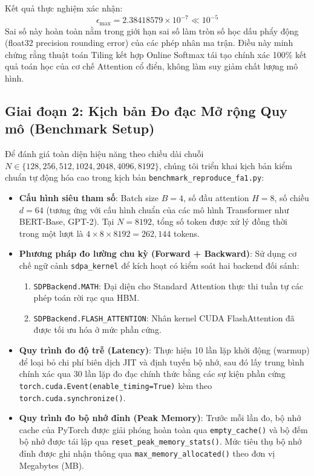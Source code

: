 \documentclass[10pt,a4paper]{article}
\begin{document}
Kết quả thực nghiệm xác nhận:
\begin{equation}
\epsilon_{\max} = 2.38418579 \times 10^{-7} \ll 10^{-5}
\end{equation}
Sai số này hoàn toàn nằm trong giới hạn sai số làm tròn số học dấu phẩy động (float32 precision rounding error) của các phép nhân ma trận. Điều này minh chứng rằng thuật toán Tiling kết hợp Online Softmax tái tạo chính xác 100\% kết quả toán học của cơ chế Attention cổ điển, không làm suy giảm chất lượng mô hình.

\subsection{Giai đoạn 2: Kịch bản Đo đạc Mở rộng Quy mô (Benchmark Setup)}
Để đánh giá toàn diện hiệu năng theo chiều dài chuỗi $N \in \{128, 256, 512, 1024, 2048, 4096, 8192\}$, chúng tôi triển khai kịch bản kiểm chuẩn tự động hóa cao trong kịch bản \texttt{benchmark\_reproduce\_fa1.py}:
\begin{itemize}[leftmargin=*]
    \item \textbf{Cấu hình siêu tham số}: Batch size $B = 4$, số đầu attention $H = 8$, số chiều $d = 64$ (tương ứng với cấu hình chuẩn của các mô hình Transformer như BERT-Base, GPT-2). Tại $N = 8192$, tổng số token được xử lý đồng thời trong một lượt là $4 \times 8 \times 8192 = 262{,}144$ tokens.
    \item \textbf{Phương pháp đo lường chu kỳ (Forward + Backward)}: Sử dụng cơ chế ngữ cảnh \texttt{\small sdpa\_kernel} để kích hoạt có kiểm soát hai backend đối sánh:
    \begin{enumerate}
        \item \texttt{SDPBackend.MATH}: Đại diện cho Standard Attention thực thi tuần tự các phép toán rời rạc qua HBM.
        \item \texttt{SDPBackend.FLASH\_ATTENTION}: Nhân kernel CUDA FlashAttention đã được tối ưu hóa ở mức phần cứng.
    \end{enumerate}
    \item \textbf{Quy trình đo độ trễ (Latency)}: Thực hiện 10 lần lặp khởi động (warmup) để loại bỏ chi phí biên dịch JIT và định tuyến bộ nhớ, sau đó lấy trung bình chính xác qua 30 lần lặp đo đạc chính thức bằng các sự kiện phần cứng \texttt{torch.cuda.Event(enable\_timing=True)} kèm theo \texttt{torch.cuda.synchronize()}.
    \item \textbf{Quy trình đo bộ nhớ đỉnh (Peak Memory)}: Trước mỗi lần đo, bộ nhớ cache của PyTorch được giải phóng hoàn toàn qua \texttt{\small empty\_cache()} và bộ đếm bộ nhớ được tái lập qua \texttt{\small reset\_peak\_memory\_stats()}. Mức tiêu thụ bộ nhớ đỉnh được ghi nhận thông qua \texttt{\small max\_memory\_allocated()} theo đơn vị Megabytes (MB).
\end{itemize}
\end{document}
